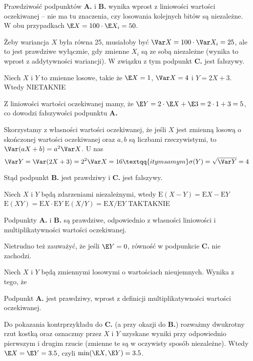 \begin{solutions}
    Prawdziwość podpunktów \textbf{A.} i \textbf{B.} wynika wprost z liniowości wartości oczekiwanej -- nie ma tu znaczenia, czy losowania kolejnych bitów są niezależne. W obu przypadkach $\E X = 100 \cdot \E X_i = 50$.

    Żeby wariancja $X$ była równa 25, musiałoby być $\Var X = 100 \cdot \Var X_i = 25$, ale to jest prawdziwe wyłącznie, gdy zmienne $X_i$ są ze sobą niezależne (wynika to wprost z addytywności wariancji). W związku z tym podpunkt \textbf{C.} jest fałszywy.
    
    \sol Niech $X$ i $Y$ to zmienne losowe, takie że $\E X = 1$, $\Var X = 4$ i $Y = 2X + 3$. Wtedy
    {NIE}{TAK}{NIE}

    Z liniowości wartości oczekiwanej mamy, że $\E Y = 2 \cdot \E X + \E 3 = 2 \cdot 1 + 3 = 5$, co dowodzi fałszywości podpunktu \textbf{A.}

    Skorzystamy z własności wartości oczekiwanej, że jeśli $X$ jest zmienną losową o skończonej wartości oczekiwanej oraz $a, b$ są liczbami rzeczywistymi, to $\Var (aX + b) = a^2 \Var X$. U nas
    $$\Var Y = \Var (2X + 3) = 2^2 \Var X = 16 \textqq{ i tym samym } \sigma(Y) = \sqrt{\Var Y} = 4$$

    Stąd podpunkt \textbf{B.} jest prawdziwy i \textbf{C.} jest fałszywy.

    \sol Niech $X$ i $Y$ będą zdarzeniami niezależnymi, wtedy
    \answerss
    {$\mathrm{E}(X - Y) = \mathrm{E}X - \mathrm{E}Y$}
    {$\mathrm{E}(XY) = \mathrm{E}X \cdot \mathrm{E}Y$}
    {$\mathrm{E}(X / Y) = \mathrm{E}X / \mathrm{E}Y$}
    {TAK}{TAK}{NIE}

    Podpunkty \textbf{A.} i \textbf{B.} są prawdziwe, odpowiednio z własności liniowości i multiplikatywności wartości oczekiwanej.

    Nietrudno też zauważyć, że jeśli $\E Y = 0$, równość w podpunkcie \textbf{C.} nie zachodzi.

    \sol Niech $X$ i $Y$ będą zmiennymi losowymi o wartościach nieujemnych. Wynika z tego, że

    Podpunkt \textbf{A.} jest prawdziwy, wprost z definicji multiplikatywności wartości oczekiwanej.

    Do pokazania kontrprzykładu do \textbf{C.} (a przy okazji do \textbf{B.}) rozważmy dwukrotny rzut kostką oraz oznaczmy przez $X$ i $Y$ uzyskane wyniki przy odpowiednio pierwszym i drugim rzucie (zmienne te są w oczywisty sposób niezależne). Wtedy $\E X = \E Y = 3.5$, czyli $\min(\E X, \E Y) = 3.5$.
    

\end{solutions}
